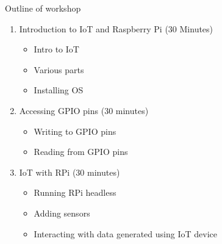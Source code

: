 \begin{frame}{Outline of workshop}
	\begin{enumerate}
		\item Introduction to IoT and Raspberry Pi ($30$ Minutes)
		\begin{itemize}
			\item Intro to IoT
			\item Various parts
			\item Installing OS
		\end{itemize}
		\item Accessing GPIO pins ($30$ minutes)
		\begin{itemize}
			\item Writing to GPIO pins
			\item Reading from GPIO pins
		\end{itemize}
		\item IoT with RPi ($30$ minutes)
		\begin{itemize}
			\item Running RPi headless 
			\item Adding sensors
			\item Interacting with data generated using IoT device
		\end{itemize}
	\end{enumerate}
\end{frame}


